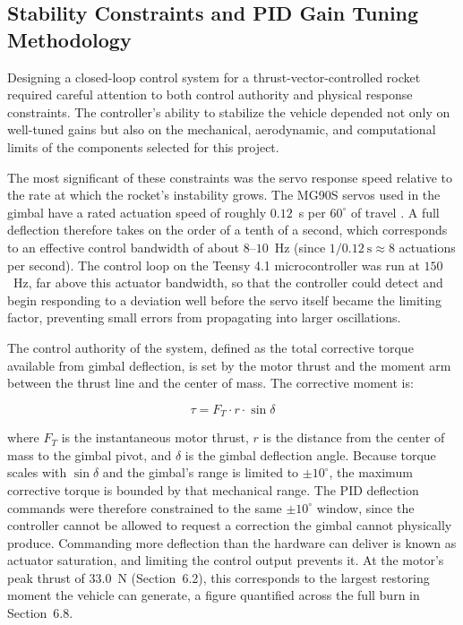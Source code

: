 \subsection{Stability Constraints and PID Gain Tuning Methodology}
\label{subsec:tuning}

Designing a closed-loop control system for a thrust-vector-controlled rocket required careful attention to both control authority and physical response constraints. The controller's ability to stabilize the vehicle depended not only on well-tuned gains but also on the mechanical, aerodynamic, and computational limits of the components selected for this project.

The most significant of these constraints was the servo response speed relative to the rate at which the rocket's instability grows. The MG90S servos used in the gimbal have a rated actuation speed of roughly $0.12$~s per $60^\circ$ of travel \cite{towerpro_mg90s}. A full deflection therefore takes on the order of a tenth of a second, which corresponds to an effective control bandwidth of about $8$--$10$~Hz (since $1/0.12~\text{s} \approx 8$ actuations per second). The control loop on the Teensy 4.1 microcontroller was run at $150$~Hz, far above this actuator bandwidth, so that the controller could detect and begin responding to a deviation well before the servo itself became the limiting factor, preventing small errors from propagating into larger oscillations.

The control authority of the system, defined as the total corrective torque available from gimbal deflection, is set by the motor thrust and the moment arm between the thrust line and the center of mass. The corrective moment is:

\[
\tau = F_T \cdot r \cdot \sin\delta
\]

where $F_T$ is the instantaneous motor thrust, $r$ is the distance from the center of mass to the gimbal pivot, and $\delta$ is the gimbal deflection angle. Because torque scales with $\sin\delta$ and the gimbal's range is limited to $\pm 10^\circ$, the maximum corrective torque is bounded by that mechanical range. The PID deflection commands were therefore constrained to the same $\pm 10^\circ$ window, since the controller cannot be allowed to request a correction the gimbal cannot physically produce. Commanding more deflection than the hardware can deliver is known as actuator saturation, and limiting the control output prevents it. At the motor's peak thrust of $33.0$~N (Section~6.2), this corresponds to the largest restoring moment the vehicle can generate, a figure quantified across the full burn in Section~6.8.


